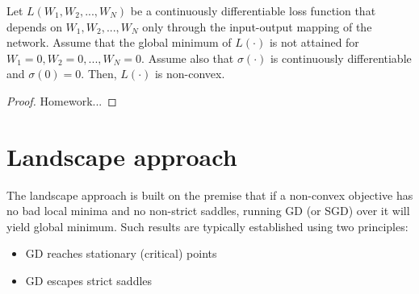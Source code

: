 \documentclass[12pt]{article}
\begin{document}
	\begin{proposition}
	\label{proposition:optimization in deep learning is non-convex, other assumptions}				
		Let $L(W_1,W_2,...,W_N)$ be a continuously differentiable loss function that depends on $W_1,W_2,...,W_N$ only through the input-output mapping of the network.
		Assume that the global minimum of $L(\cdot)$ is not attained for $W_1=0,W_2=0,...,W_N=0$.
		Assume also that $\sigma(\cdot)$ is continuously differentiable and $\sigma(0)=0$.
		Then, $L(\cdot)$ is non-convex.
	\end{proposition}
	\begin{proof}
	    Homework...
	\end{proof}
	\section{Landscape approach}
	The landscape approach is built on the premise that if a non-convex objective has no bad local minima and no non-strict saddles, running GD (or SGD) over it will yield global minimum. Such results are typically established using two principles:
	\begin{itemize}
      \item GD reaches stationary (critical) points
      \item GD escapes strict saddles
    \end{itemize}
\end{document}
